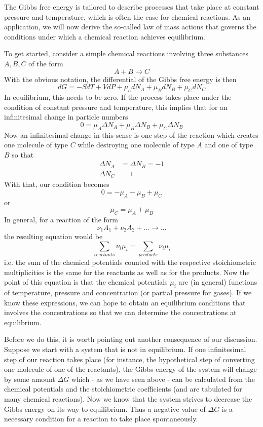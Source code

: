 \documentclass[a4paper, draft]{article}
\theoremstyle{own}
\theoremstyle{remark}
\begin{document}
The Gibbs free energy is tailored to describe processes that take place at constant pressure and temperature, which is often the case for chemical reactions. As an application, we will now derive the so-called law of mass actions that governs the conditions under which a chemical reaction achieves equilibrium.

To get started, consider a simple chemical reactions involving three substances $A, B, C$ of the form
$$
A + B \longrightarrow C
$$
With the obvious notation, the differential of the Gibbs free energy is then
$$
dG = - S dT + V dP + \mu_a dN_A + \mu_B dN_B + \mu_C dN_C
$$
In equilibrium, this needs to be zero. If the process takes place under the condition of constant pressure and temperature, this implies that for an infinitesimal change in particle numbers
$$
0 =  \mu_A \Delta N_A + \mu_B \Delta N_B + \mu_C \Delta N_B
$$
Now an infinitesimal change in this sense is one step of the reaction which creates one molecule of type $C$ while destroying one molecule of type $A$ and one of type $B$ so that
\begin{align*}
\Delta N_A &= \Delta N_B = -1 \\
\Delta N_C &= 1
\end{align*}
With that, our condition becomes
$$
0 = - \mu_A - \mu_B + \mu_C
$$
or
$$
\mu_C = \mu_A + \mu_B
$$
In general, for a reaction of the form
$$
\nu_1 A_1 + \nu_2 A_2 +  \dots \longrightarrow \dots
$$
the resulting equation would be 
$$
\sum_{reactants} \nu_i \mu_i = \sum_{products} \nu_i \mu_i
$$
i.e. the sum of the chemical potentials counted with the respective stoichiometric multiplicities is the same for the reactants as well as for the products. Now the point of this equation is that the chemical potentials $\mu_i$ are (in general) functions of temperature, pressure and concentration (or partial pressure for gases). If we know these expressions, we can hope to obtain an equilibrium conditions that involves the concentrations so that we can determine the concentrations at equilibrium.

Before we do this, it is worth pointing out another consequence of our discussion. Suppose we start with a system that is not in equilibrium. If one infinitesimal step of our reaction takes place (for instance, the hypothetical step of converting one molecule of one of the reactants), the Gibbs energy of the system will change by some amount $\Delta G$ which - as we have seen above - can be calculated from the chemical potentials and the stoichiometric coefficients (and are tabulated for many chemical reactions). Now we know that the system strives to decrease the Gibbs energy on its way to equilibrium. Thus a negative value of $\Delta G$ is a necessary condition for a reaction to take place spontaneously. 
\end{document}

